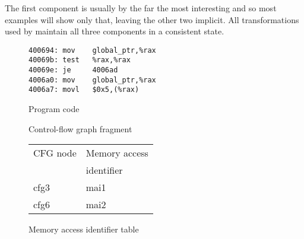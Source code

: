 The first component is usually by the far the most interesting and so
most examples will show only that, leaving the other two implicit.
All transformations used by {\technique} maintain all three components
in a consistent state.

\begin{figure}
  \begin{minipage}{50mm}
    \begin{subfloat}
      \begin{minipage}{50mm}
\begin{verbatim}
400694: mov    global_ptr,%rax
40069b: test   %rax,%rax
40069e: je     4006ad
4006a0: mov    global_ptr,%rax
4006a7: movl   $0x5,(%rax)
\end{verbatim}
      \end{minipage}
      \caption{Program code}
    \end{subfloat}
    \vspace{50pt}
    \begin{subfloat}
      \hspace{20mm}
      \caption{Control-flow graph fragment}
    \end{subfloat}
    \begin{subfloat}
      \begin{tabular}{ll}
        CFG node & Memory access \\
                 & identifier \\
        cfg3     & mai1 \\
        cfg6     & mai2 \\
      \end{tabular}
      \caption{Memory access identifier table}
    \end{subfloat}
  \end{minipage}
  \begin{subfloat}
    \begin{minipage}{30mm}
\end{minipage}
\end{subfloat}
\end{figure}
